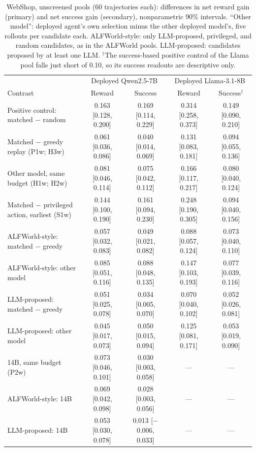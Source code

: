 \documentclass{article}
\theoremstyle{plain}
\theoremstyle{definition}
\theoremstyle{remark}
\begin{document}
\begin{table}[!htbp]
  \caption{WebShop, unscreened pools (60 trajectories each): differences in net reward gain (primary) and net success gain (secondary), nonparametric 90\% intervals. ``Other model'': deployed agent's own selection minus the other deployed model's, five rollouts per candidate each. ALFWorld-style: only LLM-proposed, privileged, and random candidates, as in the ALFWorld pools. LLM-proposed: candidates proposed by at least one LLM. $^\dagger$The success-based positive control of the Llama pool falls just short of 0.10, so its success readouts are descriptive only.}
  \label{tab:webshop}
  \centering
  \footnotesize
  \setlength{\tabcolsep}{3.4pt}
  \begin{tabular}{@{}lcc|cc@{}}
    \toprule
    & \multicolumn{2}{c|}{Deployed Qwen2.5-7B} & \multicolumn{2}{c}{Deployed Llama-3.1-8B} \\
    Contrast & Reward & Success & Reward & Success$^\dagger$ \\
    \midrule
    Positive control: matched $-$ random & 0.163 [0.128, 0.200] & 0.169 [0.114, 0.229] & 0.314 [0.258, 0.373] & 0.149 [0.090, 0.210] \\
    Matched $-$ greedy replay (P1w; H3w) & 0.061 [0.036, 0.086] & 0.040 [0.014, 0.069] & 0.131 [0.083, 0.181] & 0.094 [0.055, 0.136] \\
    Other model, same budget (H1w; H2w) & 0.081 [0.046, 0.114] & 0.075 [0.042, 0.112] & 0.166 [0.117, 0.217] & 0.080 [0.040, 0.124] \\
    Matched $-$ privileged action, earliest (S1w) & 0.144 [0.100, 0.190] & 0.161 [0.094, 0.230] & 0.248 [0.190, 0.305] & 0.094 [0.040, 0.156] \\
    \midrule
    ALFWorld-style: matched $-$ greedy & 0.057 [0.032, 0.083] & 0.049 [0.021, 0.082] & 0.088 [0.057, 0.124] & 0.073 [0.040, 0.110] \\
    ALFWorld-style: other model & 0.085 [0.051, 0.116] & 0.088 [0.048, 0.135] & 0.147 [0.103, 0.193] & 0.077 [0.039, 0.116] \\
    LLM-proposed: matched $-$ greedy & 0.051 [0.025, 0.078] & 0.034 [0.005, 0.070] & 0.070 [0.040, 0.102] & 0.052 [0.026, 0.081] \\
    LLM-proposed: other model & 0.045 [0.017, 0.073] & 0.050 [0.015, 0.094] & 0.125 [0.081, 0.171] & 0.053 [0.019, 0.090] \\
    \midrule
    14B, same budget (P2w) & 0.073 [0.046, 0.101] & 0.030 [0.003, 0.058] & --- & --- \\
    ALFWorld-style: 14B & 0.069 [0.042, 0.098] & 0.028 [0.003, 0.056] & --- & --- \\
    LLM-proposed: 14B & 0.053 [0.030, 0.078] & 0.013 [$-$0.006, 0.033] & --- & --- \\
    \bottomrule
  \end{tabular}
\end{table}
\end{document}

